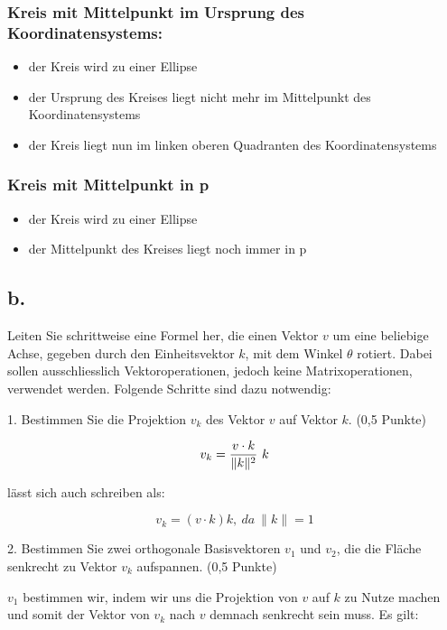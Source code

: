 \documentclass[12pt]{scrreprt}
\begin{document}
\subsubsection*{Kreis mit Mittelpunkt im Ursprung des Koordinatensystems:}

\begin{itemize}
  \item der Kreis wird zu einer Ellipse
  \item der Ursprung des Kreises liegt nicht mehr im Mittelpunkt des
Koordinatensystems
  \item der Kreis liegt nun im linken oberen Quadranten des Koordinatensystems
\end{itemize}

\subsubsection*{Kreis mit Mittelpunkt in p}

\begin{itemize}
  \item der Kreis wird zu einer Ellipse
  \item der Mittelpunkt des Kreises liegt noch immer in p
\end{itemize}


\subsection*{b.}

Leiten Sie schrittweise eine Formel her, die einen Vektor $v$ um eine beliebige Achse, gegeben durch den
Einheitsvektor $k$, mit dem Winkel $\theta$ rotiert. Dabei sollen ausschliesslich Vektoroperationen, jedoch keine
Matrixoperationen, verwendet werden. Folgende Schritte sind dazu notwendig:

1. Bestimmen Sie die Projektion $v_k$ des Vektor $v$ auf Vektor $k$. (0,5 Punkte)

\[
	v_k = {v \cdot k \over \|k\|^2}~k
\]

lässt sich auch schreiben als:

\[
	v_k = (v \cdot k)k, ~da ~\| k \| = 1
\]

2. Bestimmen Sie zwei orthogonale Basisvektoren $v_1$ und $v_2$, die die Fläche senkrecht zu Vektor $v_k$
aufspannen. (0,5 Punkte)

$v_1$ bestimmen wir, indem wir uns die Projektion von $v$ auf $k$ zu Nutze machen und somit der Vektor von $v_k$ nach $v$ demnach senkrecht sein muss. Es gilt:
\end{document}
